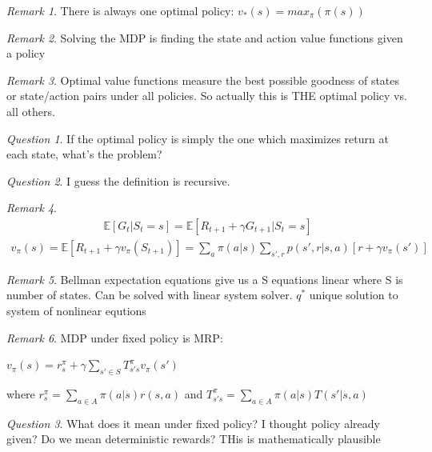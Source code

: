 \documentclass[11pt]{article}
\newcommand{\E}{\mathbb{E}}
\theoremstyle{remark}
\newtheorem{remark}{Remark}
\newtheorem{quest}{Question}
\begin{document}
\begin{remark}
	There is always one optimal policy: $v_*(s) = max_{\pi}(\pi(s))$
\end{remark}

\begin{remark}
	Solving the MDP is finding the state and action value functions given a policy
\end{remark}

\begin{remark}
	Optimal value functions measure the best possible goodness of states or state/action pairs under all policies. So actually this is THE optimal policy vs. all others. 
\end{remark}

\begin{quest}
	If the optimal policy is simply the one which maximizes return at each state, what's the problem?
\end{quest}

\begin{quest}
	I guess the definition is recursive.
\end{quest}

\begin{remark}
	\begin{align*}
		\E[G_t | S_t = s] = \E[R_{t+1} + \gamma G_{t+1} | S_t = s]
	\end{align*}
	\begin{align*}
		v_{\pi}(s) = \E[R_{t+1} + \gamma v_{\pi}(S_{t+1})] = \sum_a \pi(a|s) \sum_{s',r}p(s',r|s,a)[r+\gamma v_{\pi}(s')]
	\end{align*}
\end{remark}

\begin{remark}
	Bellman expectation equations give us a S equations linear where S is number of states. Can be solved with linear system solver. $q^*$ unique solution to system of nonlinear equtions
\end{remark}

\begin{remark}
	MDP under fixed policy is MRP:

	$v_{\pi}(s) = r_s^{\pi}+\gamma \sum_{s' \in S}T_{s's}^{\pi}v_{\pi}(s')$

	where $r_s^{\pi} = \sum_{a \in A}\pi(a | s) r(s,a)$ and $T_{s's}^{\pi} = \sum_{a \in A}\pi(a|s)T(s'|s,a)$
\end{remark}

\begin{quest}
	What does it mean under fixed policy? I thought policy already given? Do we mean deterministic rewards? THis is mathematically plausible
\end{quest}
\end{document}

